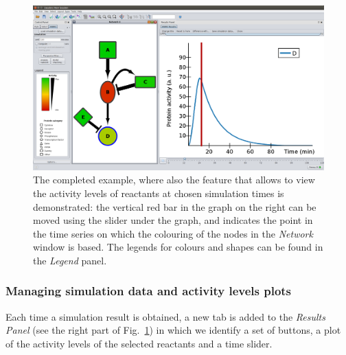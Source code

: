 \documentclass{article}
\begin{document}
\begin{figure}[!tpb]
\begin{minipage}{\textwidth}
\begin{center}
  \includegraphics[width=.9\textheight, angle=90]{images/esempio_uso_ANIMO_new}
\end{center}
\caption{The completed example, where also the feature that allows to view the activity levels
of reactants at chosen simulation times is demonstrated: the vertical red bar in the graph on the
right can be moved using the slider under the graph, and indicates the point in the time series
on which the colouring of the nodes in the \emph{Network} window is based.
The legends for colours and shapes can be found in the \emph{Legend} panel.}\label{fig:rete-esempio}
\end{minipage}
\end{figure}


\subsubsection{Managing simulation data and activity levels plots}
Each time a simulation result is obtained, a new tab is added to the \emph{Results Panel} (see the right part of Fig.~\ref{fig:rete-esempio})
in which we identify a set of buttons, a plot of the activity levels of the selected reactants and a time slider.
\end{document}

